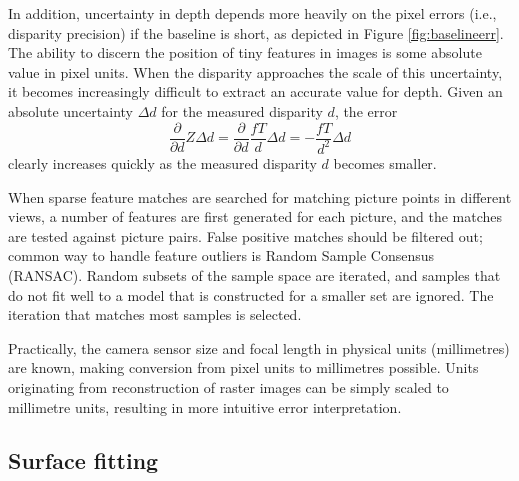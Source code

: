 In addition, uncertainty in depth depends more heavily on the pixel errors (i.e., disparity precision) if the baseline is short, as depicted in Figure \ref{fig:baselineerr}.
The ability to discern the position of tiny features in images is some absolute value in pixel units.
When the disparity approaches the scale of this uncertainty, it becomes increasingly difficult to extract an accurate value for depth.
Given an absolute uncertainty $\Delta d$ for the measured disparity $d$, the error
\begin{equation}
	\frac{\partial}{\partial d} Z \Delta d =
	\frac{\partial}{\partial d} \frac{fT}{d} \Delta d =
	-\frac{fT}{d^2} \Delta d
\end{equation}
clearly increases quickly as the measured disparity $d$ becomes smaller.


When sparse feature matches are searched for matching picture points in different views, a number of features are first generated for each picture, and the matches are tested against picture pairs.
False positive matches should be filtered out; common way to handle feature outliers is Random Sample Consensus (RANSAC).
Random subsets of the sample space are iterated, and samples that do not fit well to a model that is constructed for a smaller set are ignored.
The iteration that matches most samples is selected. \cite{hartley03multiview}


Practically, the camera sensor size and focal length in physical units (millimetres) are known, making conversion from pixel units to millimetres possible.
Units originating from reconstruction of raster images can be simply scaled to millimetre units, resulting in more intuitive error interpretation.




\subsection{Surface fitting} %

